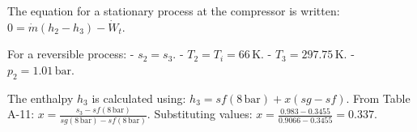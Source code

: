 The equation for a stationary process at the compressor is written:  
\( 0 = \dot{m}(h_2 - h_3) - \dot{W}_t \).  

For a reversible process:  
- \( s_2 = s_3 \).  
- \( T_2 = T_i = 66 \, \text{K} \).  
- \( T_3 = 297.75 \, \text{K} \).  
- \( p_2 = 1.01 \, \text{bar} \).  

The enthalpy \( h_3 \) is calculated using:  
\( h_3 = sf(8 \, \text{bar}) + x(sg - sf) \).  
From Table A-11:  
\( x = \frac{s_3 - sf(8 \, \text{bar})}{sg(8 \, \text{bar}) - sf(8 \, \text{bar})} \).  
Substituting values:  
\( x = \frac{0.983 - 0.3455}{0.9066 - 0.3455} = 0.337 \).